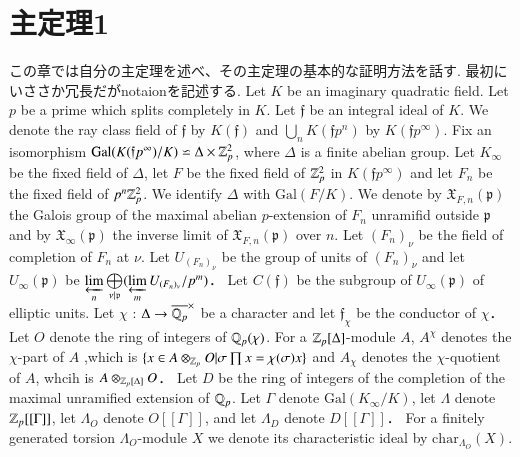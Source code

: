 \documentclass{ujarticle}
\newcommand\p{\mathfrak{p}}
\newcommand\f{\mathfrak{f}}
\newcommand\G{\mathrm{Gal}}
\begin{document}
\section{主定理1}
\label{sec:主定理1}
この章では自分の主定理を述べ、その主定理の基本的な証明方法を話す.
最初にいささか冗長だがnotaionを記述する.
Let $K$ be an imaginary quadratic field.
Let  $p$ be a prime which  splits completely in $K$.
Let $\f$ be an integral ideal of $K$.
We denote the ray class field of $\f$  by $K(\f)$ and  $\bigcup\limits_{n} K(\mathfrak{f} p^n)$ by $K(\mathfrak{f} p^{\infty})$.
Fix an isomorphism $\G(K(\f p^{\infty})/K) \backsimeq \Delta \times \Z_p^2$, where $\Delta$ is a finite abelian group.
Let $K_{\infty}$ be the fixed field of $\Delta$, let  $F$ be the fixed field of $\mathbb{Z}_p^2$ in $K(\f p^{\infty})$ and let $F_n$ be the fixed field of $p^n\mathbb{Z}_p^2$.
We identify $\Delta$  with $\G(F/K)$.
We denote by $\mathfrak{X}_{F,n}(\p)$ the Galois group of the maximal abelian $p$-extension of $F_n$ unramifid outside $\p$ and by $\mathfrak{X}_{\infty}(\p)$ the inverse limit of $\mathfrak{X}_{F,n}(\p)$ over $n$.
Let $(F_n)_{\nu}$ be the field of completion of $F_n$ at $\nu$.
Let $U_{(F_n)_{\nu}}$ be the group of units of $(F_n)_{\nu}$ and let $U_{\infty}(\mathfrak{p})$ be  $\varprojlim\limits_{n}\bigoplus\limits_{\nu | {\mathfrak{p}}}(\varprojlim\limits_mU_{(F_n)_{\nu}}/p^m)$．
Let $C(\mathfrak{f})$ be the subgroup of $U_{\infty}(\mathfrak{p})$ of elliptic units.
Let $\chi$ : $\Delta \to \overline{\mathbb{Q}_p}^{\times}$ be a character  and let $\mathfrak{f}_{\chi}$ be the conductor of $\chi$．
Let $O$ denote the ring of integers of  $\mathbb{Q}_p(\chi)$.
For a $\mathbb{Z}_p[\Delta]$-module $A$, $A^{\chi}$ denotes the $\chi$-part of $A$ ,which is $\{ x \in A \otimes_{\mathbb{Z}_p}O| \sigma \prod x=\chi(\sigma)x \}$ and $A_{\chi}$ denotes the $\chi$-quotient of $A$, whcih is $A \otimes_{\mathbb{Z}_p[\Delta]}O$．
Let $D$ be the ring of integers of the completion of the maximal unramified extension of $\mathbb{Q}_p$.
Let $\Gamma$ denote $\G(K_{\infty}/K)$, let $\Lambda$ denote $\mathbb{Z}_p[[\Gamma]]$, let $\Lambda_O$ denote $O[[\Gamma]]$, and let $\Lambda_D$ denote $D[[\Gamma]]$．
For a finitely generated torsion $\Lambda_O$-module $X$ we denote its characteristic ideal  by $\mathrm{char}_{\Lambda_O}(X)$.%
\end{document}
